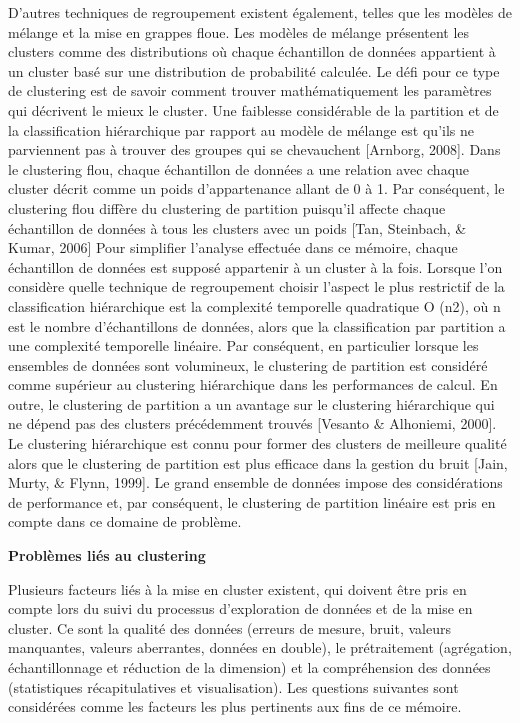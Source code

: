 \documentclass[12pt]{article}
\begin{document}
{D'autres techniques de regroupement existent également, telles que les modèles de mélange et la mise en grappes floue. Les modèles de mélange présentent les clusters comme des distributions où chaque échantillon de données appartient à un cluster basé sur une distribution de probabilité calculée.
Le défi pour ce type de clustering est de savoir comment trouver mathématiquement les paramètres qui décrivent le mieux le cluster. Une faiblesse considérable de la partition et de la classification hiérarchique par rapport au modèle de mélange est qu'ils ne parviennent pas à trouver des groupes qui se chevauchent {\color{red}[Arnborg, 2008]}. 
Dans le clustering flou, chaque échantillon de données a une relation avec chaque cluster décrit comme un poids d'appartenance allant de 0 à 1. Par conséquent, le clustering flou diffère du clustering de partition puisqu'il affecte chaque échantillon de données à tous les clusters avec un poids {\color{red}[Tan, Steinbach, \& Kumar, 2006]} 
Pour simplifier l'analyse effectuée dans ce mémoire, chaque échantillon de données est supposé appartenir à un cluster à la fois.
Lorsque l'on considère quelle technique de regroupement choisir l'aspect le plus restrictif de la classification hiérarchique est la complexité temporelle quadratique O (n2), où n est le nombre d'échantillons de données, alors que la classification par partition a une complexité temporelle linéaire. Par conséquent, en particulier lorsque les ensembles de données sont volumineux, le clustering de partition est considéré comme supérieur au clustering hiérarchique dans les performances de calcul. En outre, le clustering de partition a un avantage sur le clustering hiérarchique qui ne dépend pas des clusters précédemment trouvés {\color{red}[Vesanto \& Alhoniemi, 2000]}.
Le clustering hiérarchique est connu pour former des clusters de meilleure qualité alors que le clustering de partition est plus efficace dans la gestion du bruit {\color{red}[Jain, Murty, \& Flynn, 1999]}. Le grand ensemble de données impose des considérations de performance et, par conséquent, le clustering de partition linéaire est pris en compte dans ce domaine de problème.

\textbf{Problèmes liés au clustering}

Plusieurs facteurs liés à la mise en cluster existent, qui doivent être pris en compte lors du suivi du processus d'exploration de données et de la mise en cluster. Ce sont la qualité des données (erreurs de mesure, bruit, valeurs manquantes, valeurs aberrantes, données en double), le prétraitement (agrégation, échantillonnage et réduction de la dimension) et la compréhension des données (statistiques récapitulatives et visualisation). Les questions suivantes sont considérées comme les facteurs les plus pertinents aux fins de ce mémoire.


}
\end{document}
